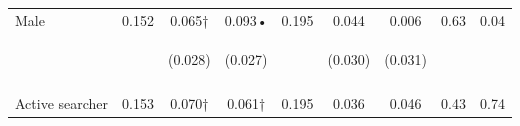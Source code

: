\begin{tabular}{lcccccccc}
\noalign{\smallskip}Male & 0.152 & 0.065† & 0.093• & 0.195 & 0.044 & 0.006 & 0.63 & 0.04\\
 & \begin{footnotesize}\end{footnotesize} & \begin{footnotesize}(0.028)\end{footnotesize} & \begin{footnotesize}(0.027)\end{footnotesize} & \begin{footnotesize}\end{footnotesize} & \begin{footnotesize}(0.030)\end{footnotesize} & \begin{footnotesize}(0.031)\end{footnotesize} & \begin{footnotesize}\end{footnotesize} & \begin{footnotesize}\end{footnotesize}\\
 & \begin{footnotesize}\end{footnotesize} & \begin{footnotesize}[0.021]\end{footnotesize} & \begin{footnotesize}[0.004]\end{footnotesize} & \begin{footnotesize}\end{footnotesize} & \begin{footnotesize}[0.505]\end{footnotesize} & \begin{footnotesize}[1.000]\end{footnotesize} & \begin{footnotesize}\end{footnotesize} & \begin{footnotesize}\end{footnotesize}\\
\noalign{\smallskip}Active searcher & 0.153 & 0.070† & 0.061† & 0.195 & 0.036 & 0.046 & 0.43 & 0.74\\

\end{tabular}
